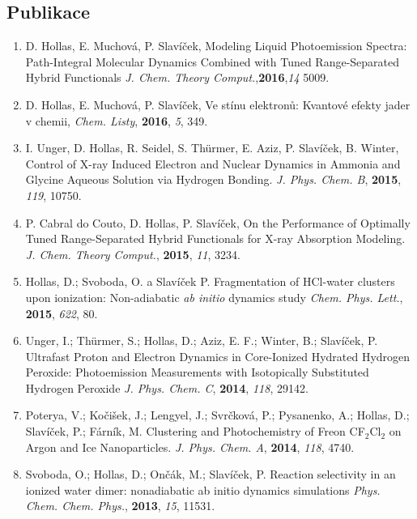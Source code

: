 \documentclass[a4paper,10pt]{article}
\begin{document}
\subsection*{Publikace}

\begin{enumerate}[(1)]
\item D. Hollas, E. Muchová, P. Slavíček, Modeling Liquid Photoemission Spectra: Path-Integral Molecular Dynamics Combined with Tuned Range-Separated Hybrid Functionals \textit{J. Chem. Theory Comput.},\textbf{2016},\textit{14} 5009.

\item D. Hollas, E. Muchová, P. Slavíček, Ve stínu elektronů: Kvantové efekty jader v chemii, \textit{Chem. Listy}, \textbf{2016}, \textit{5}, 349.

\item 
I. Unger, D. Hollas, R. Seidel, S. Thürmer, E. Aziz, P. Slavíček, B. Winter, Control of X-ray Induced Electron and Nuclear Dynamics in Ammonia and Glycine Aqueous Solution via Hydrogen Bonding. \textit{J. Phys. Chem. B}, \textbf{2015}, \textit{119}, 10750.


\item P. Cabral do Couto, D. Hollas, P. Slavíček, On the Performance of Optimally Tuned Range-Separated Hybrid Functionals for X-ray Absorption Modeling. \textit{J. Chem. Theory Comput.}, \textbf{2015}, \textit{11}, 3234.

\item Hollas, D.; Svoboda, O. a Slavíček P. Fragmentation of HCl-water clusters upon ionization: Non-adiabatic \textit{ab initio} dynamics study \textit{Chem. Phys. Lett.}, \textbf{2015}, \textit{622}, 80.

\item Unger, I.; Thürmer, S.; Hollas, D.; Aziz, E. F.; Winter, B.; Slavíček, P. Ultrafast Proton and Electron Dynamics in Core-Ionized Hydrated Hydrogen Peroxide: Photoemission Measurements with Isotopically Substituted Hydrogen Peroxide \textit{J. Phys. Chem. C}, \textbf{2014}, \textit{118}, 29142.

\item Poterya, V.; Kočišek, J.; Lengyel, J.; Svrčková, P.; Pysanenko, A.; Hollas, D.; Slavíček, P.; Fárník, M. Clustering and Photochemistry of Freon CF$_2$Cl$_2$ on Argon and Ice Nanoparticles. \textit{J. Phys. Chem. A}, \textbf{2014}, \textit{118}, 4740.

\item Svoboda, O.; Hollas, D.; Ončák, M.; Slavíček, P. Reaction selectivity in an ionized water dimer: nonadiabatic ab initio dynamics simulations \textit{Phys. Chem. Chem. Phys.}, \textbf{2013}, \textit{15}, 11531.


\end{enumerate}
\end{document}
